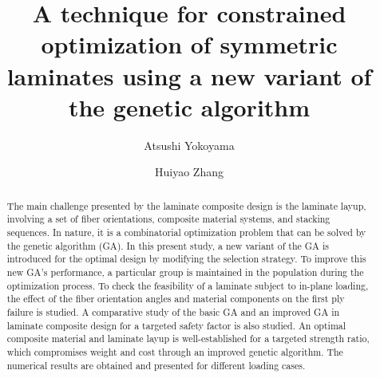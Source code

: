 \documentclass[USenglish,twocolumn]{article}
\begin{document}
  \author*[1]{Atsushi Yokoyama}

\author[2]{Huiyao Zhang}



  \title{\huge A technique for constrained optimization of symmetric laminates using a new variant of the genetic algorithm}



  \begin{abstract}
{The main challenge presented by the laminate composite design is the laminate layup, involving a
set of fiber orientations, composite material systems, and stacking sequences. In nature, it is a
combinatorial optimization problem that can be solved by the genetic algorithm (GA). In this present
study, a new variant of the GA is introduced for the optimal design by modifying the selection
strategy. To improve this new GA's performance, a particular group is maintained in the population
during the optimization process. To check the feasibility of a laminate subject to in-plane
loading, the effect of the fiber orientation angles and material components on the first ply failure is
studied. A comparative study of the basic GA and an improved GA in laminate composite design for a
targeted safety factor is also studied. An optimal composite material and laminate layup is
well-established for a targeted strength ratio, which compromises weight and cost through an improved
genetic algorithm. The numerical results are obtained and presented for different loading cases. }
\end{abstract}



\maketitle
\end{document}

